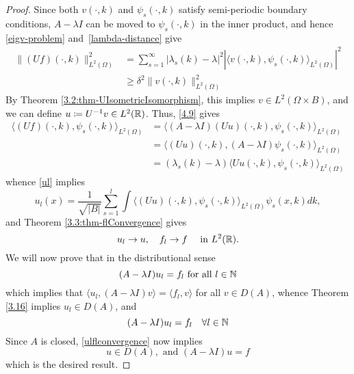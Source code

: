 \begin{theorem}
\begin{proof}
		Since both $v(\cdot, k)$ and $\psi_{s}(\cdot, k)$ satisfy semi-periodic boundary conditions, $A - \lambda I$ can be moved to $\psi_{s}(\cdot, k)$ in the inner product, and hence \eqref{eigv-problem} and \eqref{lambda-distance} give
		\begin{align*}
			\| (Uf)(\cdot,k)\|^{2}_{L^{2}(\Omega)} & = \sum_{s=1}^{\infty} |\lambda_{s}(k) - \lambda|^{2} |\langle v(\cdot, k), \psi_{s}(\cdot, k)\rangle_{L^{2}(\Omega)}|^{2} \\
			& \geq \delta^{2} \| v(\cdot, k)\|^{2}_{L^{2}(\Omega)}
		\end{align*}
		By Theorem \ref{3.2:thm-UIsometricIsomorphism}, this implies $v \in L^{2}(\Omega \times B)$, and we can define $u \coloneqq U^{-1} v \in L^{2}(\mathbb{R})$. Thus, \eqref{4.9} gives
			\begin{align*}
				\langle (Uf)(\cdot, k), \psi_{s}(\cdot, k) \rangle_{L^{2}(\Omega)} & = \langle (A - \lambda I)(Uu)(\cdot, k), \psi_{s}(\cdot, k) \rangle_{L^{2}(\Omega)} \\
					& = \langle (Uu)(\cdot,k), (A - \lambda I) \psi_{s}(\cdot, k) \rangle_{L^{2}(\Omega)} \\
					& = (\lambda_{s}(k) - \lambda) \langle Uu(\cdot, k), \psi_{s}(\cdot, k) \rangle_{L^{2}(\Omega)}
			\end{align*}
		whence \eqref{ul} implies
			\[ u_{l}(x) = \frac{1}{\sqrt{|B|}} \sum_{s=1}^{l} \int \langle (Uu)(\cdot, k), \psi_{s}(\cdot, k)\rangle_{L^{2}(\Omega)} \psi_{s}(x, k) dk, \]
		and Theorem \ref{3.3:thm-flConvergence} gives
			\begin{equation}
				u_{l} \rightarrow u, \quad f_{l} \rightarrow f \quad \text{ in } L^{2}(\mathbb{R}). \label{ulflconvergence}
			\end{equation}
		We will now prove that in the distributional sense 
		\begin{equation}
				(A - \lambda I) u_{l} = f_{l} \text{ for all } l \in \mathbb{N} \label{lefttoprove}
			\end{equation} 
		which implies that $\langle u_{l}, (A - \lambda I) v \rangle = \langle f_{l}, v\rangle$ for all $v \in D(A)$, whence Theorem \ref{3.16} implies $u_{l} \in D(A)$, and
			\[ (A - \lambda I) u_{l} = f_{l} \quad \forall l \in \mathbb{N} \]
		Since $A$ is closed, \eqref{ulflconvergence} now implies
			\[ u \in D(A), \text{ and } (A - \lambda I) u = f \]
		which is the desired result.
		

\end{proof}
\end{theorem}
